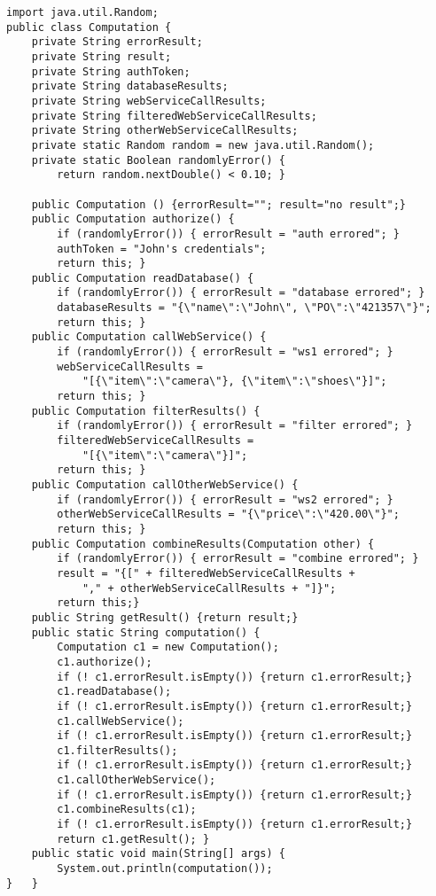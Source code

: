 \documentclass[11pt]{article}
\begin{document}
\begin{verbatim}
import java.util.Random;
public class Computation {
    private String errorResult;
    private String result;
    private String authToken;
    private String databaseResults;
    private String webServiceCallResults;
    private String filteredWebServiceCallResults;
    private String otherWebServiceCallResults;
    private static Random random = new java.util.Random();
    private static Boolean randomlyError() {
        return random.nextDouble() < 0.10; }

    public Computation () {errorResult=""; result="no result";}
    public Computation authorize() {
        if (randomlyError()) { errorResult = "auth errored"; }
        authToken = "John's credentials";
        return this; }
    public Computation readDatabase() {
        if (randomlyError()) { errorResult = "database errored"; }
        databaseResults = "{\"name\":\"John\", \"PO\":\"421357\"}";
        return this; }
    public Computation callWebService() {
        if (randomlyError()) { errorResult = "ws1 errored"; }
        webServiceCallResults =
            "[{\"item\":\"camera\"}, {\"item\":\"shoes\"}]";
        return this; }
    public Computation filterResults() {
        if (randomlyError()) { errorResult = "filter errored"; }
        filteredWebServiceCallResults =
            "[{\"item\":\"camera\"}]";
        return this; }
    public Computation callOtherWebService() {
        if (randomlyError()) { errorResult = "ws2 errored"; }
        otherWebServiceCallResults = "{\"price\":\"420.00\"}";
        return this; }
    public Computation combineResults(Computation other) {
        if (randomlyError()) { errorResult = "combine errored"; }
        result = "{[" + filteredWebServiceCallResults +
            "," + otherWebServiceCallResults + "]}"; 
        return this;}
    public String getResult() {return result;}
    public static String computation() {
        Computation c1 = new Computation();
        c1.authorize();
        if (! c1.errorResult.isEmpty()) {return c1.errorResult;}
        c1.readDatabase();
        if (! c1.errorResult.isEmpty()) {return c1.errorResult;}
        c1.callWebService();
        if (! c1.errorResult.isEmpty()) {return c1.errorResult;}
        c1.filterResults();
        if (! c1.errorResult.isEmpty()) {return c1.errorResult;}
        c1.callOtherWebService();
        if (! c1.errorResult.isEmpty()) {return c1.errorResult;}
        c1.combineResults(c1);
        if (! c1.errorResult.isEmpty()) {return c1.errorResult;}
        return c1.getResult(); }
    public static void main(String[] args) {
        System.out.println(computation());
}   }
\end{verbatim}
\end{document}
